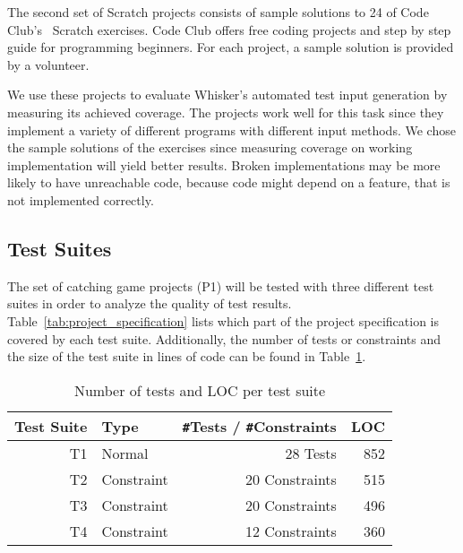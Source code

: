 The second set of Scratch projects consists of sample solutions to 24 of Code Club's~\cite{codeclub} Scratch exercises.
Code Club offers free coding projects and step by step guide for programming beginners.
For each project, a sample solution is provided by a volunteer.
\parspace

We use these projects to evaluate Whisker's automated test input generation by measuring its achieved coverage.
The projects work well for this task since they implement a variety of different programs with different input methods.
We chose the sample solutions of the exercises since measuring coverage on working implementation will yield better results.
Broken implementations may be more likely to have unreachable code,
because code might depend on a feature, that is not implemented correctly.

\subsection{Test Suites}

The set of catching game projects (P1) will be tested with three different test suites in order to analyze the quality of test results.
Table~\ref{tab:project_specification} lists which part of the project specification is covered by each test suite.
Additionally, the number of tests or constraints and the size of the test suite in lines of code can be found in Table~\ref{tab:test_suite_statistics}.

\begin{table}[htpb]
    \centering
    \scriptsize
    \begin{tabular}{rlrr}
        \toprule
        Test Suite & Type       & \texttt{\#}Tests / \texttt{\#}Constraints & LOC \\
        \midrule
        T1         & Normal     & 28 Tests                                  & 852 \\
        T2         & Constraint & 20 Constraints                            & 515 \\
        T3         & Constraint & 20 Constraints                            & 496 \\
        T4         & Constraint & 12 Constraints                            & 360 \\
        \bottomrule
    \end{tabular}

    \caption{Number of tests and LOC per test suite}
    \label{tab:test_suite_statistics}
\end{table}

